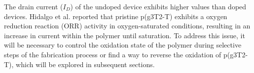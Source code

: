 The drain current ($I_{D}$) of the undoped device exhibits higher values than doped devices. Hidalgo et al.  \cite{hidalgocastilloSimultaneousPerformanceStability2022a} reported that pristine p(g3T2-T) exhibits a oxygen reduction reaction (ORR) activity in oxygen-saturated conditions, resulting in an increase in current within the polymer until saturation. To address this issue, it will be necessary to control the oxidation state of the polymer during selective steps of the fabrication process or find a way to reverse the oxidation of p(g3T2-T), which will be explored in subsequent sections.

\begin{figure}[!ht]
    \centering
    \qquad

\end{figure}
